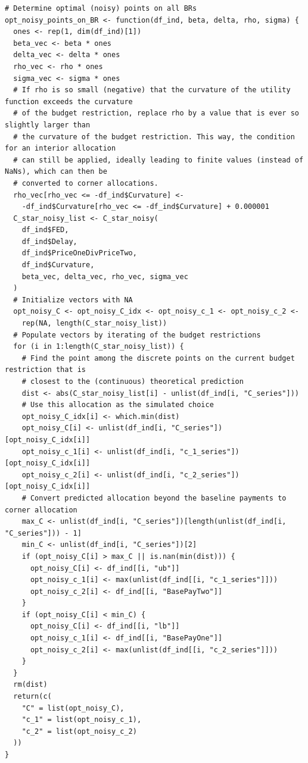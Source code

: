 \documentclass[11pt, a4paper, oneside]{article}
\theoremstyle{Plain}
\theoremstyle{Definition}
\theoremstyle{Remark}
\begin{document}
\begin{appendix}
\begin{lstlisting}
# Determine optimal (noisy) points on all BRs
opt_noisy_points_on_BR <- function(df_ind, beta, delta, rho, sigma) {
  ones <- rep(1, dim(df_ind)[1])
  beta_vec <- beta * ones
  delta_vec <- delta * ones
  rho_vec <- rho * ones
  sigma_vec <- sigma * ones
  # If rho is so small (negative) that the curvature of the utility function exceeds the curvature
  # of the budget restriction, replace rho by a value that is ever so slightly larger than
  # the curvature of the budget restriction. This way, the condition for an interior allocation
  # can still be applied, ideally leading to finite values (instead of NaNs), which can then be
  # converted to corner allocations.
  rho_vec[rho_vec <= -df_ind$Curvature] <-
    -df_ind$Curvature[rho_vec <= -df_ind$Curvature] + 0.000001
  C_star_noisy_list <- C_star_noisy(
    df_ind$FED,
    df_ind$Delay,
    df_ind$PriceOneDivPriceTwo,
    df_ind$Curvature,
    beta_vec, delta_vec, rho_vec, sigma_vec
  )
  # Initialize vectors with NA
  opt_noisy_C <- opt_noisy_C_idx <- opt_noisy_c_1 <- opt_noisy_c_2 <-
    rep(NA, length(C_star_noisy_list))
  # Populate vectors by iterating of the budget restrictions
  for (i in 1:length(C_star_noisy_list)) {
    # Find the point among the discrete points on the current budget restriction that is
    # closest to the (continuous) theoretical prediction
    dist <- abs(C_star_noisy_list[i] - unlist(df_ind[i, "C_series"]))
    # Use this allocation as the simulated choice
    opt_noisy_C_idx[i] <- which.min(dist)
    opt_noisy_C[i] <- unlist(df_ind[i, "C_series"])[opt_noisy_C_idx[i]]
    opt_noisy_c_1[i] <- unlist(df_ind[i, "c_1_series"])[opt_noisy_C_idx[i]]
    opt_noisy_c_2[i] <- unlist(df_ind[i, "c_2_series"])[opt_noisy_C_idx[i]]
    # Convert predicted allocation beyond the baseline payments to corner allocation
    max_C <- unlist(df_ind[i, "C_series"])[length(unlist(df_ind[i, "C_series"])) - 1]
    min_C <- unlist(df_ind[i, "C_series"])[2]
    if (opt_noisy_C[i] > max_C || is.nan(min(dist))) {
      opt_noisy_C[i] <- df_ind[[i, "ub"]]
      opt_noisy_c_1[i] <- max(unlist(df_ind[[i, "c_1_series"]]))
      opt_noisy_c_2[i] <- df_ind[[i, "BasePayTwo"]]
    }
    if (opt_noisy_C[i] < min_C) {
      opt_noisy_C[i] <- df_ind[[i, "lb"]]
      opt_noisy_c_1[i] <- df_ind[[i, "BasePayOne"]]
      opt_noisy_c_2[i] <- max(unlist(df_ind[[i, "c_2_series"]]))
    }
  }
  rm(dist)
  return(c(
    "C" = list(opt_noisy_C),
    "c_1" = list(opt_noisy_c_1),
    "c_2" = list(opt_noisy_c_2)
  ))
}


\end{lstlisting}
\end{appendix}
\end{document}
